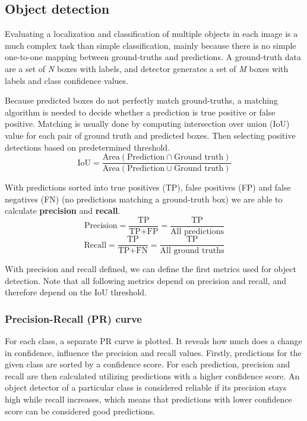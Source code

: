 \subsection*{Object detection}
Evaluating a localization and classification of multiple objects in each image is a much complex task than simple classification, mainly because there is no simple one-to-one mapping between ground-truths and predictions. A ground-truth data are a set of \textit{N} boxes with labels, and detector generates a set of \textit{M} boxes with labels and class confidence values.

Because predicted boxes do not perfectly match ground-truths, a matching algorithm is needed to decide whether a prediction is true positive or false positive. Matching is usually done by computing intersection over union (IoU) value for each pair of ground truth and predicted boxes. Then selecting positive detections based on predetermined threshold.
$$\text{IoU} = \frac{\text{Area}(\text{Prediction} \cap \text{Ground truth})}{\text{Area}(\text{Prediction} \cup \text{Ground truth})}$$

With predictions sorted into true positives (TP), false positives (FP) and false negatives (FN) (no predictions matching a ground-truth box) we are able to calculate \textbf{precision} and \textbf{recall}.
$$\text{Precision} = \frac{\text{TP}}{\text{TP}+\text{FP}} = \frac{\text{TP}}{\text{All predictions}}$$
$$\text{Recall} = \frac{\text{TP}}{\text{TP}+\text{FN}} = \frac{\text{TP}}{\text{All ground truths}}$$

With precision and recall defined, we can define the first metrics used for object detection. Note that all following metrics depend on precision and recall, and therefore depend on the IoU threshold.

\subsubsection{Precision-Recall (PR) curve}
For each class, a separate PR curve is plotted. It reveals how much does a change in confidence, influence the precision and recall values. Firstly, predictions for the given class are sorted by a confidence score. For each prediction, precision and recall are then calculated utilizing predictions with a higher confidence score. An object detector of a particular class is considered reliable if its precision stays high while recall increases, which means that predictions with lower confidence score can be considered good predictions.


